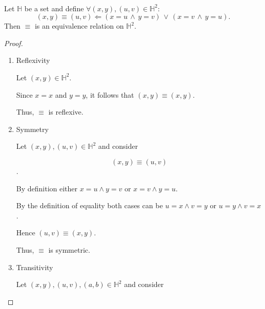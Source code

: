 \begin{theorem}
    \leavevmode\\
    Let $\mathbb{H}$ be a set and define $\forall(x,y),(u,v)\in\mathbb{H}^2$:
    $$(x,y)\equiv(u,v) \Longleftarrow (x=u\,\land\,y=v)\,\lor\,(x=v\,\land\,y=u).$$
    Then $\equiv$ is an equivalence relation on $\mathbb{H}^2$.
    \begin{proof}
        \leavevmode\\
        \begin{enumerate}
            \item \parbox[t]{\linewidth}{
                Reflexivity

                \medskip

                Let $(x,y)\in\mathbb{H}^2$.

                \medskip

                Since $x=x$ and $y=y$, it follows that
                $(x,y)\equiv(x,y)$.

                \medskip
                
                Thus, $\equiv$ is reflexive.
            }
            \item \parbox[t]{\linewidth}{
                Symmetry

                \medskip

                Let $(x,y),(u,v)\in\mathbb{H}^2$ and consider

                \medskip

                $$(x,y)\equiv(u,v)$$.

                \medskip

                By definition either $x=u\land y=v$ or $x=v\land y=u$.

                \medskip

                By the definition of equality both cases can be $u=x\land v=y$ or $u=y\land v=x$.

                Hence $(u,v)\equiv(x,y)$.

                \medskip

                Thus, $\equiv$ is symmetric.
            }
            \item \parbox[t]{\linewidth}{
                Transitivity

                \medskip

                Let $(x,y),(u,v),(a,b)\in\mathbb{H}^2$ and consider

                \medskip

}
\end{enumerate}
\end{proof}
\end{theorem}
